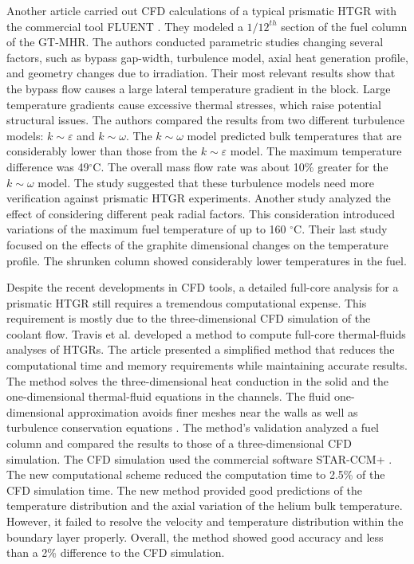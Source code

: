 Another article \cite{sato_computational_2010} carried out \gls{CFD} calculations of a typical prismatic \gls{HTGR} with the commercial tool FLUENT \cite{fluent_inc_fluent_2006}.
They modeled a $1/12^{th}$ section of the fuel column of the GT-MHR.
The authors conducted parametric studies changing several factors, such as bypass gap-width, turbulence model, axial heat generation profile, and geometry changes due to irradiation.
Their most relevant results show that the bypass flow causes a large lateral temperature gradient in the block.
Large temperature gradients cause excessive thermal stresses, which raise potential structural issues.
The authors compared the results from two different turbulence models: $k \sim \varepsilon$ and $k \sim \omega$.
The $k \sim \omega$ model predicted bulk temperatures that are considerably lower than those from the $k \sim \varepsilon$ model.
The maximum temperature difference was 49$^{\circ}$C.
The overall mass flow rate was about 10$\%$ greater for the $k \sim \omega$ model.
The study suggested that these turbulence models need more verification against prismatic \gls{HTGR} experiments.
Another study analyzed the effect of considering different peak radial factors.
This consideration introduced variations of the maximum fuel temperature of up to 160 $^{\circ}$C.
Their last study focused on the effects of the graphite dimensional changes on the temperature profile.
The shrunken column showed considerably lower temperatures in the fuel.

Despite the recent developments in CFD tools, a detailed full-core analysis for a prismatic \gls{HTGR} still requires a tremendous computational expense.
This requirement is mostly due to the three-dimensional CFD simulation of the coolant flow.
Travis et al. \cite{travis_thermalhydraulics_2013} developed a method to compute full-core thermal-fluids analyses of \glspl{HTGR}.
The article presented a simplified method that reduces the computational time and memory requirements while maintaining accurate results.
The method solves the three-dimensional heat conduction in the solid and the one-dimensional thermal-fluid equations in the channels.
The fluid one-dimensional approximation avoids finer meshes near the walls as well as turbulence conservation equations \cite{tak_development_2014}.
The method's validation analyzed a fuel column and compared the results to those of a three-dimensional CFD simulation.
The CFD simulation used the commercial software STAR-CCM+ \cite{cd-adapco_star-ccm_2012}.
The new computational scheme reduced the computation time to 2.5\% of the CFD simulation time.
The new method provided good predictions of the temperature distribution and the axial variation of the helium bulk temperature.
However, it failed to resolve the velocity and temperature distribution within the boundary layer properly.
Overall, the method showed good accuracy and less than a 2\% difference to the CFD simulation.

